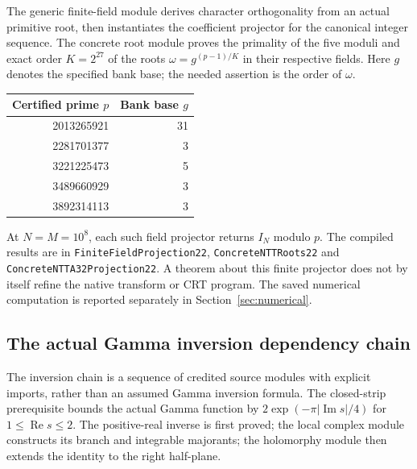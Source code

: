 The generic finite-field module derives character orthogonality from an
actual primitive root, then instantiates the coefficient projector for the
canonical integer sequence. The concrete root module proves the primality
of the five moduli and exact order $K=2^{27}$ of the roots
$\omega=g^{(p-1)/K}$ in their respective fields. Here $g$ denotes the
specified bank base; the needed assertion is the order of $\omega$.

\begin{center}
\begin{tabular}{rr}
\toprule Certified prime $p$ & Bank base $g$\\\midrule
2013265921 & 31\\
2281701377 & 3\\
3221225473 & 5\\
3489660929 & 3\\
3892314113 & 3\\
\bottomrule
\end{tabular}
\end{center}

At $N=M=10^8$, each such field projector returns $I_N$ modulo $p$.
The compiled results are in \nolinkurl{FiniteFieldProjection22},
\nolinkurl{ConcreteNTTRoots22} and
\nolinkurl{ConcreteNTTA32Projection22}. A theorem about this finite
projector does not by itself refine the native transform or CRT program.
The saved numerical computation is reported separately in
Section~\ref{sec:numerical}.

\subsection{The actual Gamma inversion dependency chain}

The inversion chain is a sequence of credited source modules with explicit
imports, rather than an assumed Gamma inversion formula. The closed-strip
prerequisite bounds the actual Gamma function by
$2\exp(-\pi|\operatorname{Im}s|/4)$ for
$1\leq\operatorname{Re}s\leq2$. The positive-real inverse is first proved;
the local complex module constructs its branch and integrable majorants;
the holomorphy module then extends the identity to the right half-plane.

